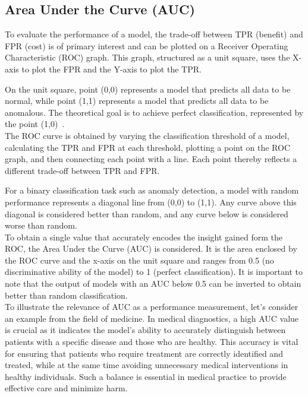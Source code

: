 \subsection{Area Under the Curve (AUC)}
To evaluate the performance of a model, the trade-off between TPR (benefit) and FPR (cost) is of primary interest and can be plotted on a Receiver Operating Characteristic (ROC) graph. This graph, structured as a unit square, uses the X-axis to plot the FPR and the Y-axis to plot the TPR.


On the unit square, point (0,0) represents a model that predicts all data to be normal, while point (1,1) represents a model that predicts all data to be anomalous. The theoretical goal is to achieve perfect classification, represented by the point (1,0)~\cite{fawcett2006introduction}. \\
The ROC curve is obtained by varying the classification threshold of a model, calculating the TPR and FPR at each threshold, plotting a point on the ROC graph, and then connecting each point with a line. Each point thereby reflects a different trade-off between TPR and FPR.


For a binary classification task such as anomaly detection, a model with random performance represents a diagonal line from (0,0) to (1,1). Any curve above this diagonal is considered better than random, and any curve below is considered worse than random. \\
To obtain a single value that accurately encodes the insight gained form the ROC, the Area Under the Curve (AUC) is considered. It is the area enclosed by the ROC curve and the x-axis on the unit square and ranges from 0.5 (no discriminative ability of the model) to 1 (perfect classification). It is important to note that the output of models with an AUC below 0.5 can be inverted to obtain better than random classification. \\
To illustrate the relevance of AUC as a performance measurement, let's consider an example from the field of medicine. In medical diagnostics, a high AUC value is crucial as it indicates the model's ability to accurately distinguish between patients with a specific disease and those who are healthy. This accuracy is vital for ensuring that patients who require treatment are correctly identified and treated, while at the same time avoiding unnecessary medical interventions in healthy individuals. Such a balance is essential in medical practice to provide effective care and minimize harm.

